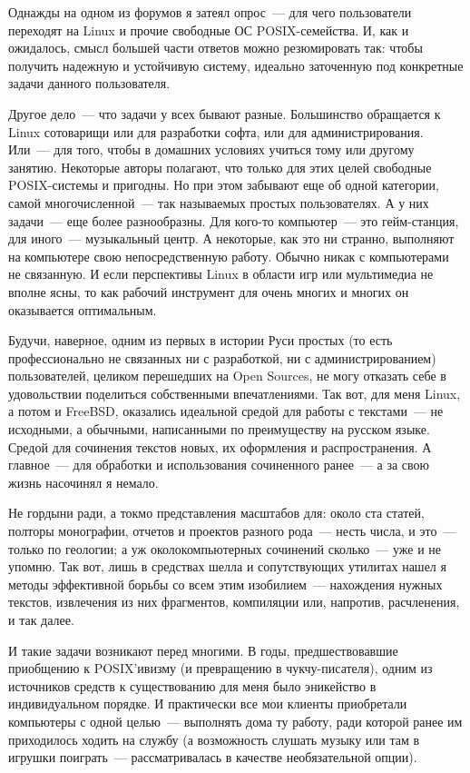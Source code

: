 Однажды на одном из форумов я затеял опрос~--- для чего пользователи переходят на Linux и прочие свободные ОС POSIX-семейства. И, как и ожидалось, смысл большей части ответов можно резюмировать так: чтобы получить надежную и устойчивую систему, идеально заточенную под конкретные задачи данного пользователя.

Другое дело~--- что задачи у всех бывают разные. Большинство обращается к Linux сотоварищи или для разработки софта, или для администрирования. Или~--- для того, чтобы в домашних условиях учиться тому или другому занятию. Некоторые авторы полагают, что только для этих целей свободные POSIX-системы и пригодны. Но при этом забывают еще об одной категории, самой многочисленной~--- так называемых простых пользователях. А у них задачи~--- еще более разнообразны. Для кого-то компьютер~--- это гейм-станция, для иного~--- музыкальный центр. А некоторые, как это ни странно, выполняют на компьютере свою непосредственную работу. Обычно никак с компьютерами не связанную. И если перспективы Linux в области игр или мультимедиа не вполне ясны, то как рабочий инструмент для очень многих и многих он оказывается оптимальным.

Будучи, наверное, одним из первых в истории Руси простых (то есть профессионально не связанных ни с разработкой, ни с администрированием) пользователей, целиком перешедших на Open Sources, не могу отказать себе в удовольствии поделиться собственными впечатлениями. Так вот, для меня Linux, а потом и FreeBSD, оказались идеальной средой для работы с текстами~--- не исходными, а обычными, написанными по преимуществу на русском языке. Средой для сочинения текстов новых, их оформления и распространения. А главное~--- для обработки и использования сочиненного ранее~--- а за свою жизнь насочинял я немало.

Не гордыни ради, а токмо представления масштабов для: около ста статей, полторы монографии, отчетов и проектов разного рода~--- несть числа, и это~--- только по геологии; а уж околокомпьютерных сочинений сколько~--- уже и не упомню. Так вот, лишь в средствах шелла и сопутствующих утилитах нашел я методы эффективной борьбы со всем этим изобилием~--- нахождения нужных текстов, извлечения из них фрагментов, компиляции или, напротив, расчленения, и так далее.

И такие задачи возникают перед многими. В годы, предшествовавшие приобщению к POSIX'ивизму (и превращению в чукчу-писателя), одним из источников средств к существованию для меня было эникейство в индивидуальном порядке. И практически все мои клиенты приобретали компьютеры с одной целью~--- выполнять дома ту работу, ради которой ранее им приходилось ходить на службу (а возможность слушать музыку или там в игрушки поиграть~--- рассматривалась в качестве необязательной опции).

